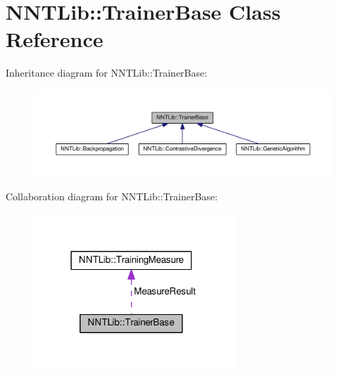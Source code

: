\hypertarget{class_n_n_t_lib_1_1_trainer_base}{}\section{N\+N\+T\+Lib\+:\+:Trainer\+Base Class Reference}
\label{class_n_n_t_lib_1_1_trainer_base}


Inheritance diagram for N\+N\+T\+Lib\+:\+:Trainer\+Base\+:\nopagebreak
\begin{figure}[H]
\begin{center}
\leavevmode
\includegraphics[width=350pt]{class_n_n_t_lib_1_1_trainer_base__inherit__graph}
\end{center}
\end{figure}


Collaboration diagram for N\+N\+T\+Lib\+:\+:Trainer\+Base\+:\nopagebreak
\begin{figure}[H]
\begin{center}
\leavevmode
\includegraphics[width=214pt]{class_n_n_t_lib_1_1_trainer_base__coll__graph}
\end{center}
\end{figure}
